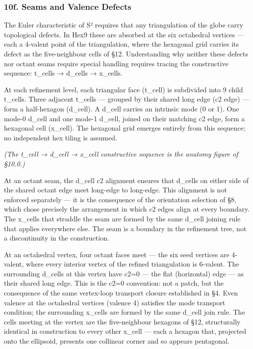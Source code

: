 \documentclass[
  11pt,
  a4paper,
]{article}
\begin{document}
\subsubsection{10f. Seams and Valence
Defects}\label{f.-seams-and-valence-defects}

The Euler characteristic of S² requires that any triangulation of the
globe carry topological defects. In Hex9 these are absorbed at the six
octahedral vertices --- each a 4-valent point of the triangulation,
where the hexagonal grid carries its defect as the five-neighbour cells
of §12. Understanding why neither these defects nor octant seams require
special handling requires tracing the constructive sequence: t\_cells →
d\_cells → x\_cells.

At each refinement level, each triangular face (t\_cell) is subdivided
into 9 child t\_cells. Three adjacent t\_cells --- grouped by their
shared long edge (c2 edge) --- form a half-hexagon (d\_cell). A d\_cell
carries an intrinsic mode (0 or 1). One mode-0 d\_cell and one mode-1
d\_cell, joined on their matching c2 edge, form a hexagonal cell
(x\_cell). The hexagonal grid emerges entirely from this sequence; no
independent hex tiling is assumed.

\emph{(The t\_cell → d\_cell → x\_cell constructive sequence is the
anatomy figure of §10.0.)}

At an octant seam, the d\_cell c2 alignment ensures that d\_cells on
either side of the shared octant edge meet long-edge to long-edge. This
alignment is not enforced separately --- it is the consequence of the
orientation selection of §8, which chose precisely the arrangement in
which c2 edges align at every boundary. The x\_cells that straddle the
seam are formed by the same d\_cell joining rule that applies everywhere
else. The seam is a boundary in the refinement tree, not a discontinuity
in the construction.

At an octahedral vertex, four octant faces meet --- the six seed
vertices are 4-valent, where every interior vertex of the refined
triangulation is 6-valent. The surrounding d\_cells at this vertex have
c2=0 --- the flat (horizontal) edge --- as their shared long edge. This
is the c2=0 convention: not a patch, but the consequence of the same
vertex-loop transport closure established in §4. Even valence at the
octahedral vertices (valence 4) satisfies the mode transport condition;
the surrounding x\_cells are formed by the same d\_cell join rule. The
cells meeting at the vertex are the five-neighbour hexagons of §12,
structurally identical in construction to every other x\_cell --- each a
hexagon that, projected onto the ellipsoid, presents one collinear
corner and so appears pentagonal.
\end{document}
